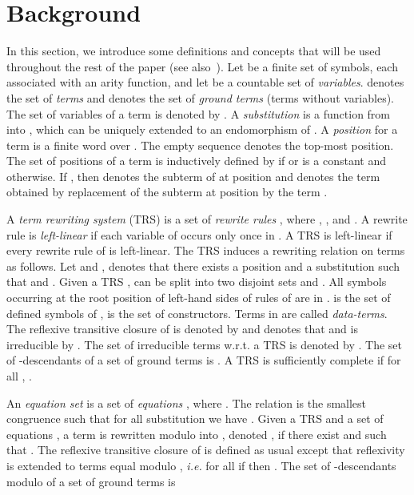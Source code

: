 \documentclass[a4paper,11pt]{llncs}
\theoremstyle{plain}
\begin{document}
\section{Background}
\label{sec:bg}

In this section, we introduce some definitions and concepts that will
be used throughout the rest of the paper (see
also~\cite{BaaderN-book98,TATA}). Let  be a
finite set of symbols, each associated with an arity function, and let
 be a countable set of {\em variables}.  denotes the set of
{\em terms} and  denotes the set of {\em ground terms} (terms
without variables). The set of variables of a term  is denoted by
. A {\em substitution} is a function  from  into
, which can be uniquely extended to an endomorphism of . A
{\em position}  for a term  is a finite word over . The empty
sequence  denotes the top-most position. The set  of
positions of a term  is inductively defined by  if  or  is a constant and  otherwise.  If
, then  denotes the subterm of  at position
 and  denotes the term obtained by replacement of the
subterm  at position  by the term .


A {\em term rewriting system} (TRS)  is a set of {\em rewrite
  rules} , where , , and
.  A rewrite rule  is {\em
  left-linear} if each variable of  occurs only once in .  A TRS  is left-linear if
every rewrite rule  of  is left-linear.  The TRS
 induces a rewriting relation  on terms as follows. Let
 and ,  denotes that there
exists a position  and a substitution  such that
 and .
Given a TRS ,  can be split into two disjoint sets  and . All symbols
occurring at the root position of left-hand sides of rules of  are in
.  is the set of defined symbols of ,  is the set of
constructors. Terms in  are called {\em data-terms}.  
The reflexive transitive closure of  is denoted by
 and  denotes that  and  is
irreducible by . The set of irreducible terms w.r.t. a TRS  is denoted
by .
The set of -descendants of a set of ground
terms  is .  
A TRS  is sufficiently complete if for all
,
. 

An {\em equation set}  is a set of {\em
  equations} , where .  
The relation  is the smallest congruence such that for all
substitution  we have . Given a TRS 
and a set of equations , a term  is rewritten modulo 
into , denoted , if there exist  and
 such that . The reflexive transitive closure
 of  is defined as usual except that reflexivity is extended to
terms equal modulo , {\em i.e.} for all  if  then .
The set of
-descendants modulo  of a set of ground terms  is 
\end{document}
